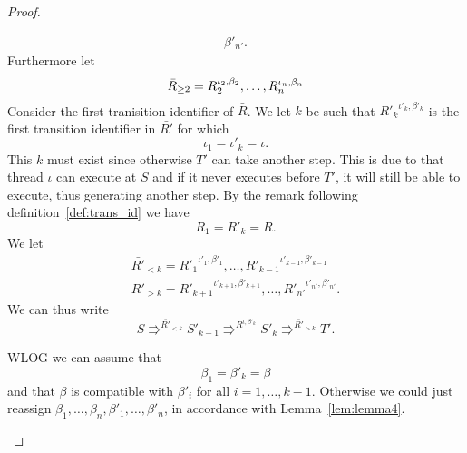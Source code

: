 \begin{proof}
\begin{description}
\begin{equation*}
\begin{gathered}
{          \beta'_{n'}}.
        \end{gathered}
      \end{equation*}
      Furthermore let
      \begin{equation*}
        \bar{R}_{\geq 2} = R_2^{\iota_2, \beta_2}, \dots, R_n^{\iota_n, \beta_n} \\
      \end{equation*}
      Consider the first tranisition identifier of $\bar{R}$. We let
      $k$ be such
      that ${R'_k}^{\iota'_k, \beta'_k}$ is the first transition identifier in
      $\bar{R'}$ for which 
      \begin{equation} \label{eq:qd1}
        \iota_1 = \iota'_k = \iota.
      \end{equation} 
      This $k$ must exist since otherwise $T'$ can take another step. This is
      due to that thread $\iota$ can execute at $S$ and if it never executes
      before $T'$, it will still be able to execute, thus generating another
      step.  By the remark following definition~\ref{def:trans_id} we have 
      \begin{equation} \label{eq:qd2}
        R_1 = R'_k = R.
      \end{equation} 
      We let
      \begin{equation*}
        \begin{gathered}
          \bar{R'}_{<k} = {R'_1}^{\iota'_1, \beta'_1}, \dots,
          {R'_{k-1}}^{\iota'_{k-1}, \beta'_{k-1}}  \\
          \bar{R'}_{>k} = {R'_{k+1}}^{\iota'_{k+1}, \beta'_{k+1}}, \dots,
          {R'_{n'}}^{\iota'_{n'}, \beta'_{n'}}.
        \end{gathered}
      \end{equation*}
      We can thus write
      \begin{equation} \label{eq:qd4}
        S \Rrightarrow^{\bar{R'}_{<k}} S'_{k-1} \Rrightarrow^{R^{\iota,
        \beta'_k}} S'_k \Rrightarrow^{\bar{R'}_{>k}} T'.
      \end{equation}

      WLOG we can assume that
      \begin{equation} \label{eq:qd3}
        \beta_1 = \beta'_k = \beta
      \end{equation}
      and that $\beta$ is compatible with $\beta'_i$ for all $i = 1, \dots,
      k-1$.  Otherwise we could just reassign $\beta_1, \dots, \beta_n,
      \beta'_1, \dots, \beta'_n$, in accordance with Lemma~\ref{lem:lemma4}.


\end{description}
\end{proof}
